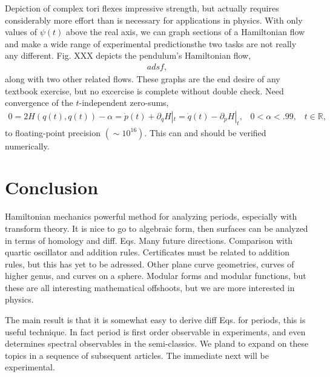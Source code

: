 \documentclass[nofootinbib,preprint]{revtex4-1}
\begin{document}
Depiction of complex tori flexes impressive strength, but actually requires considerably more 
effort than is necessary for applications in physics. With only values of $\psi(t)$ above the
real axis, we can graph sections of a Hamiltonian flow and make a wide range of experimental 
predictions\textemdash the two tasks are not really any different. Fig. XXX depicts the 
pendulum's Hamiltonian flow,
\begin{eqnarray}
adsf , \nonumber 
\end{eqnarray}
along with two other related flows. These graphs are the end desire of any textbook exercise,
but no excercise is complete without double check. Need convergence of the $t$-independent 
zero-sums, 
\begin{eqnarray}
0 = 2 H(q(t),q(t))-\alpha = \dot{p}(t) + \partial_{q} H|_t = \dot{q}(t) - \partial_{p} H|_t, 
\;\;\; 0 < \alpha < .99, \;\;\;t \in \mathbb{R},  \nonumber
\end{eqnarray}
to floating-point precision $(\sim 10^{16})$. This can and should be verified numerically. 


\section{Conclusion}

Hamiltonian mechanics powerful method for analyzing periods, 
especially with transform theory. It is nice to go to 
algebraic form, then surfaces can be analyzed in terms of 
homology and diff. Eqs. Many future directions. Comparison 
with quartic oscillator and addition rules. Certificates 
must be related to addition rules, but this has yet to 
be adressed. Other plane curve geometries, curves of higher 
genus, and curves on a sphere. Modular forms and modular 
functions, but these are all interesting mathematical 
offshoots, but we are more interested in physics.

The main result is that it is somewhat easy to derive 
diff Eqs. for periods, this is useful technique. In fact
period is first order observable in experiments, and 
even determines spectral observables in the semi-classics.
We pland to expand on these topics in a sequence of subsequent 
articles. The immediate next will be experimental.



\end{document}
